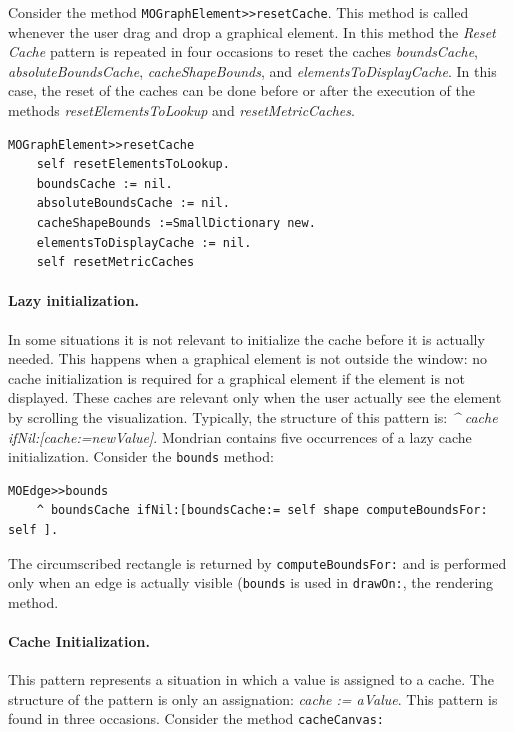 \documentclass[preprint,10pt]{sigplanconf}
\newcommand{\ct}{\lstinline[backgroundcolor=\color{white},basicstyle=\footnotesize\ttfamily]}
\begin{document}
Consider the method \ct{MOGraphElement>>resetCache}. This method is called whenever the user drag and drop a graphical element. In
this method the \emph{Reset Cache} pattern is repeated in four occasions
to reset the caches \emph{boundsCache}, \emph{absoluteBoundsCache},
\emph{cacheShapeBounds}, and \emph{elementsToDisplayCache}. In this case, the reset of the caches can be done before or after the execution of the methods \emph{resetElementsToLookup} and  \emph{resetMetricCaches}.

\begin{lstlisting} 
MOGraphElement>>resetCache 
	self resetElementsToLookup.
	boundsCache := nil. 
	absoluteBoundsCache := nil. 
	cacheShapeBounds :=SmallDictionary new. 
	elementsToDisplayCache := nil. 
	self resetMetricCaches
\end{lstlisting}



\paragraph{Lazy initialization.} In some situations it is not relevant to initialize the cache before it is actually needed. This happens when a graphical element is not outside the window: no cache initialization is required for a graphical element if the element is not displayed. These caches are relevant only when the user actually see the element by scrolling the visualization. Typically, the structure of this pattern is: \emph{\^{} cache ifNil:[cache:=newValue]}. Mondrian contains five occurrences of a lazy cache initialization. Consider the \ct{bounds} method:

\begin{lstlisting} 
MOEdge>>bounds  
	^ boundsCache ifNil:[boundsCache:= self shape computeBoundsFor: self ]. 
\end{lstlisting}

The circumscribed rectangle is returned by \ct{computeBoundsFor:} and is performed only when an edge is actually visible (\ct{bounds} is used in \ct{drawOn:}, the rendering method.

\paragraph{Cache Initialization.} This pattern represents a situation in
which a value is assigned to a cache. The structure of the pattern
is only an assignation: \emph{cache := aValue}. This pattern is found
in three occasions. Consider the method \ct{cacheCanvas:}
\end{document}
